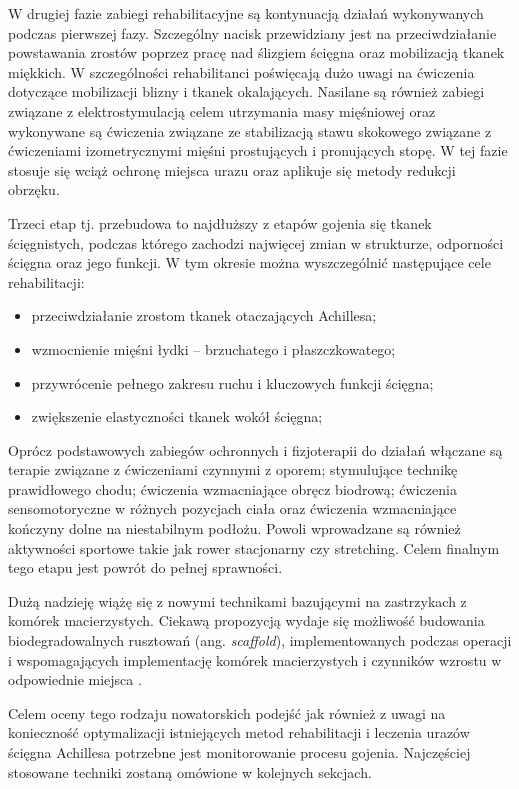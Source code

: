 W drugiej fazie zabiegi rehabilitacyjne są kontynuacją działań wykonywanych podczas pierwszej fazy. Szczególny nacisk przewidziany jest na przeciwdziałanie powstawania zrostów poprzez pracę nad ślizgiem ścięgna oraz mobilizacją tkanek miękkich. W szczególności rehabilitanci poświęcają dużo uwagi na ćwiczenia dotyczące mobilizacji blizny i tkanek okalających. Nasilane są również zabiegi związane z elektrostymulacją celem utrzymania masy mięśniowej oraz wykonywane są ćwiczenia związane ze stabilizacją stawu skokowego związane z ćwiczeniami izometrycznymi mięśni prostujących i pronujących stopę. W tej fazie stosuje się wciąż ochronę miejsca urazu oraz aplikuje się metody redukcji obrzęku.

Trzeci etap tj. przebudowa to najdłuższy z etapów gojenia się tkanek ścięgnistych, podczas którego zachodzi najwięcej zmian w strukturze, odporności ścięgna oraz jego funkcji. W tym okresie można wyszczególnić następujące cele rehabilitacji: 
\begin{itemize}
	\item przeciwdziałanie zrostom tkanek otaczających Achillesa; 
	\item wzmocnienie mięśni łydki – brzuchatego i płaszczkowatego; 
	\item przywrócenie pełnego zakresu ruchu i kluczowych funkcji ścięgna; 
	\item zwiększenie elastyczności tkanek wokół ścięgna;
\end{itemize}

Oprócz podstawowych zabiegów ochronnych i fizjoterapii do działań włączane są terapie związane z ćwiczeniami czynnymi z oporem; stymulujące technikę prawidłowego chodu; ćwiczenia wzmacniające obręcz biodrową; ćwiczenia sensomotoryczne w różnych pozycjach ciała oraz ćwiczenia wzmacniające kończyny dolne na niestabilnym podłożu. Powoli wprowadzane są również aktywności sportowe takie jak rower stacjonarny czy stretching. Celem finalnym tego etapu jest powrót do pełnej sprawności. 

Dużą nadzieję wiążę się z nowymi technikami bazującymi na zastrzykach z komórek macierzystych. Ciekawą propozycją wydaje się możliwość budowania biodegradowalnych rusztowań (ang. \textit{scaffold}), implementowanych podczas operacji i wspomagających implementację komórek macierzystych i czynników wzrostu w odpowiednie miejsca \cite{START}.

Celem oceny tego rodzaju nowatorskich podejść jak również z uwagi na konieczność optymalizacji istniejących metod rehabilitacji i leczenia urazów ścięgna Achillesa potrzebne jest monitorowanie procesu gojenia. Najczęściej stosowane techniki zostaną omówione w kolejnych sekcjach.

